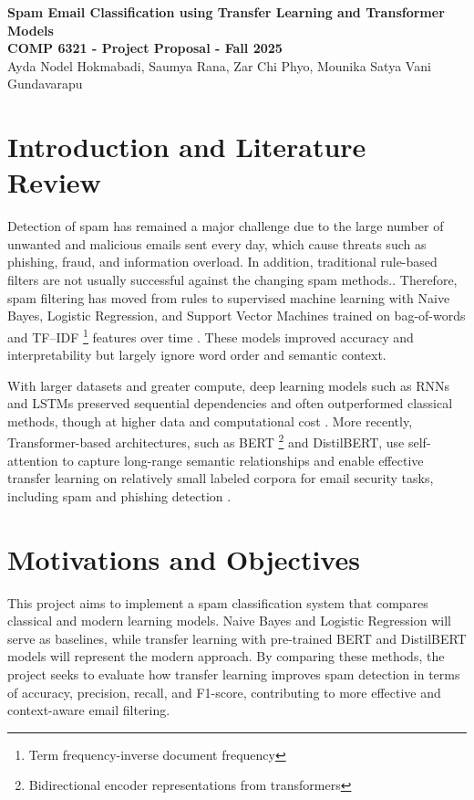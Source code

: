 \documentclass[12pt]{article}
\begin{document}
\begin{center}
{\Large \textbf{Spam Email Classification using Transfer Learning and Transformer Models}}\\[8pt]
{\small \textbf{COMP 6321 - Project Proposal - Fall 2025}}\\[5pt]
{\small Ayda Nodel Hokmabadi, Saumya Rana, Zar Chi Phyo, Mounika Satya Vani Gundavarapu}\\[3pt]
\end{center}


\section{Introduction and Literature Review}
Detection of spam has remained a major challenge due to the large number of unwanted and malicious emails sent every day, which cause threats such as phishing, fraud, and information overload. In addition, traditional rule-based filters are not usually successful against the changing spam methods.\cite{banday2009effectiveness,wang2025review}. Therefore, spam filtering has moved from rules to supervised machine learning with Naive Bayes, Logistic Regression, and Support Vector Machines trained on bag-of-words and TF--IDF \footnote{Term frequency-inverse document frequency} features over time \cite{hassan2022analytics,chavez2020nb}. These models improved accuracy and interpretability but largely ignore word order and semantic context.

With larger datasets and greater compute, deep learning models such as RNNs and LSTMs preserved sequential dependencies and often outperformed classical methods, though at higher data and computational cost \cite{johnafrica2022lstm,nasreen2024novel}. More recently, Transformer-based architectures, such as BERT \footnote{Bidirectional encoder representations from transformers} and DistilBERT, use self-attention to capture long-range semantic relationships and enable effective transfer learning on relatively small labeled corpora for email security tasks, including spam and phishing detection \cite{tida2022universal,songailaite2023bertphish,asliyuksek2025multimodal}.

\section{Motivations and Objectives}
This project aims to implement a spam classification system that compares classical and modern learning models. Naive Bayes and Logistic Regression will serve as baselines, while transfer learning with pre-trained BERT and DistilBERT models will represent the modern approach. By comparing these methods, the project seeks to evaluate how transfer learning improves spam detection in terms of accuracy, precision, recall, and F1-score, contributing to more effective and context-aware email filtering.
\end{document}
